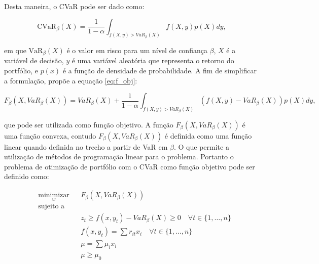                    Desta maneira, o CVaR pode ser dado como:
    
                    \begin{equation}
                        \label{eq:CVaR}
                        \text{CVaR}_{\beta}(X)=\frac{1}{1-\alpha} \int_{f(X,y)>VaR_{\beta}(X)} f(X,y) p(X) dy,
                    \end{equation}
    
                    \noindent em que $\text{VaR}_{\beta}(X)$ é o valor em risco para um nível de confiança $\beta$, $X$ é a variável de decisão, $y$ é uma variável aleatória que representa o retorno do portfólio, e $p(x)$ é a função de densidade de probabilidade. A fim de simplificar a formulação,  propõe a equação \eqref{eq:f_obj}:

                    \begin{equation}
                        \label{eq:f_obj}
                        F_{\beta}(X,VaR_{\beta}(X))=VaR_{\beta}(X)+\frac{1}{1-\alpha} \int_{f(X,y)>VaR_{\beta}(X)} (f(X,y)-VaR_{\beta}(X)) p(X) dy,
                    \end{equation}

                    \noindent que pode ser utilizada como função objetivo. A função $F_{\beta}(X,VaR_{\beta}(X))$ é uma função convexa, contudo $F_{\beta}(X,VaR_{\beta}(X))$ é definida como uma função linear quando definida no trecho a partir de VaR em $\beta$. O que permite a utilização de métodos de programação linear para o problema. Portanto o problema de otimização de portfólio com o \acrshort{CVaR} como função objetivo pode ser definido como:

                    \begin{equation}
                        \label{eq:CVaR_obj}
                        \begin{aligned}
                            & \underset{w}{\text{minimizar}}
                            & & F_{\beta}(X,VaR_{\beta}(X)) \\
                            & \text{sujeito a} \\
                            & & & z_{t} \geq f(x,y_{t})-VaR_{\beta}(X) \geq 0 \quad \forall t \in \{1, \ldots, n\} \\
                            & & & f(x,y_{t}) = \sum r_{it} x_{i}   \quad \forall t \in \{1, \ldots, n\} \\
                            & & & \mu = \sum \mu_{i} x_{i} \\
                            & & & \mu \geq \mu_0
                        \end{aligned}
                    \end{equation}

